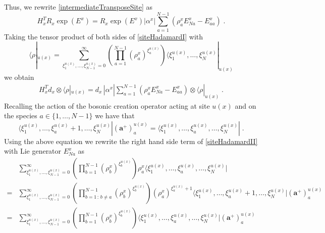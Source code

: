 \documentclass[10pt]{article}
\numberwithin{equation}{section}
\numberwithin{equation}{subsection}
\newcommand{\dt}{\;.}
\begin{document}
Thus, we rewrite \eqref{intermediateTransposeSite} as
\begin{equation}\label{siteHadamardI}
H_{x}^{T}R_{x}\exp{(E^{x})}=R_{x}\exp{(E^{x})}|\alpha^{x}|\sum_{a=1}^{N-1}\left(\rho_{a}^{x}E_{Na}^{x}-E_{aa}^{x}\right)\dt
\end{equation}
Taking the tensor product of both sides of \eqref{siteHadamardI} with 
\begin{equation}
\langle \rho|_{u(x)}=\sum_{\xi_{1}^{u(x)},\ldots,\xi_{N-1}^{u(x)}=0}^{\infty}\left(\prod_{a=1}^{N-1}\left(\rho_{a}^{x}\right)^{\xi_{a}^{u(x)}}\right)\langle \xi_{1}^{u(x)},\ldots,\xi_{N}^{u(x)}|_{u(x)}
\end{equation}
we obtain 
\begin{equation}\label{siteHadamardII}
    \begin{split}
    	H_{x}^{T}d_{x}\otimes\langle\rho|_{u(x)}=
 d_{x}\,
|\alpha^{x}|\sum_{a=1}^{N-1}\left(\rho_{a}^{x}E_{Na}^{x}-E_{aa}^{x}\right)\otimes \langle\rho|_{u(x)}\dt
    \end{split}
\end{equation}
Recalling the action of the bosonic creation operator acting at site $u(x)$ and on the species $a\in \{1,\ldots,N-1\}$ we have that 
\begin{equation}\label{bosonicKX}
    \langle \xi_{1}^{u(x)},\ldots,\xi_{a}^{u(x)}+1,\ldots,\xi_{N}^{u(x)}|(\mathbf{a}^{+})^{u(x)}_{a}=  \langle \xi_{1}^{u(x)},\ldots,\xi_{a}^{u(x)},\ldots,\xi_{N}^{u(x)}|\dt
\end{equation}
Using the above equation we rewrite the right hand side term of \eqref{siteHadamardII} with Lie generator $E_{Na}^{x}$ as 
\begin{equation}\label{extra-site-trick}
    \begin{split}
&\sum_{\xi_{1}^{u(x)},\ldots,\xi_{N-1}^{u(x)}=0}^{\infty}\left(\prod_{b=1}^{N-1}\left(\rho_{b}^{x}\right)^{\xi_{b}^{u(x)}}\right)\rho_{a}^{x}\langle \xi_{1}^{u(x)},\ldots,\xi_{a}^{u(x)},\ldots,\xi_{N}^{u(x)}|
\\=&
\sum_{\xi_{1}^{u(x)},\ldots,\xi_{N-1}^{u(x)}=0}^{\infty}\left(\prod_{b=1\,:\,b\neq a}^{N-1}\left(\rho_{b}^{x}\right)^{\xi_{b}^{u(x)}}\right)\left(\rho_{a}^{x}\right)^{\xi_{a}^{u(x)}+1}\langle \xi_{1}^{u(x)},\ldots,\xi_{a}^{u(x)}+1,\ldots,\xi_{N}^{u(x)}|(\mathbf{a}^{+})_{a}^{u(x)}
\\=&
\sum_{\xi_{1}^{u(x)},\ldots,\xi_{N-1}^{u(x)}=0}^{\infty}\left(\prod_{b=1}^{N-1}\left(\rho_{b}^{x}\right)^{\xi_{b}^{u(x)}}\right)\langle \xi_{1}^{u(x)},\ldots,\xi_{a}^{u(x)},\ldots,\xi_{N}^{u(x)}|(\mathbf{a}^{+})_{a}^{u(x)}
    \end{split}
\end{equation}
\end{document}

